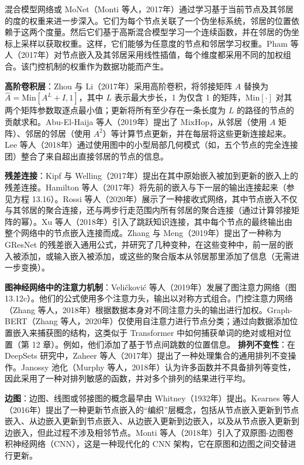 混合模型网络或 MoNet（Monti 等人，2017年）通过学习基于当前节点及其邻居的度的权重来进一步深入。它们为每个节点关联了一个伪坐标系统，邻居的位置依赖于这两个度量。然后它们基于高斯混合模型学习一个连续函数，并在邻居的伪坐标上采样以获取权重。这样，它们能够为任意度的节点和邻居学习权重。Pham 等人（2017年）对节点嵌入及其邻居采用线性插值，每个维度都采用不同的加权组合。该门控机制的权重作为数据功能而产生。

\textbf{高阶卷积层}：Zhou 与 Li（2017年）采用高阶卷积，将邻接矩阵 \(A\) 替换为 \(\hat{A} = \text{Min}[A^L + I, 1]\)，其中 \(L\) 表示最大步长，1 为仅含 1 的矩阵，\(\text{Min}[\cdot]\) 对其两个矩阵参数取逐点最小值；更新将所有至少存在一条长度为 \(L\) 的路径的节点的贡献求和。Abu-El-Haija 等人（2019年）提出了 \(\text{MixHop}\)，从邻居（使用 \(A\) 矩阵）、邻居的邻居（使用 \(A^2\)）等计算节点更新，并在每层将这些更新连接起来。Lee 等人（2018年）通过使用图中的小型局部几何模式（如，五个节点的完全连接团）整合了来自超出直接邻居的节点的信息。

\textbf{残差连接}：Kipf 与 Welling（2017年）提出在其中原始嵌入被加到更新的嵌入上的残差连接。Hamilton 等人（2017年）将先前的嵌入与下一层的输出连接起来（参见方程 13.16）。Rossi 等人（2020年）展示了一种接收式网络，其中节点嵌入不仅与其邻居的聚合连接，还与两步行走范围内所有邻居的聚合连接（通过计算邻接矩阵的幂）。Xu 等人（2018年）引入了跳跃知识连接，其中每个节点的最终输出由整个网络中的节点嵌入连接而成。Zhang 与 Meng（2019年）提出了一种称为 GResNet 的残差嵌入通用公式，并研究了几种变种，在这些变种中，前一层的嵌入被添加，或输入嵌入被添加，或这些的聚合版本从邻居那里添加了信息（无需进一步变换）。

\textbf{图神经网络中的注意力机制}：Veličković 等人（2019年）发展了图注意力网络（图 13.12c）。他们的公式使用多个注意力头，输出以对称方式组合。门控注意力网络（Zhang 等人，2018年）根据数据本身对不同注意力头的输出进行加权。Graph-BERT（Zhang 等人，2020年）仅使用自注意力进行节点分类；通过向数据添加位置嵌入来捕获图的结构，这类似于 Transformer 中如何捕获单词的绝对或相对位置（第 12 章）。例如，他们添加了基于节点间跳数的位置信息。
\textbf{排列不变性}：在 DeepSets 研究中，Zaheer 等人（2017年）提出了一种处理集合的通用排列不变操作。Janossy 池化（Murphy 等人，2018年）认为许多函数并不具备排列等变性，因此采用了一种对排列敏感的函数，并对多个排列的结果进行平均。

\textbf{边图}：边图、线图或邻接图的概念最早由 Whitney（1932年）提出。Kearnes 等人（2016年）提出了一种更新节点嵌入的“编织”层概念，包括从节点嵌入更新到节点嵌入、从边嵌入更新到节点嵌入、从边嵌入更新到边嵌入，以及从节点嵌入更新到边嵌入，但此过程不涉及相邻节点。Monti 等人（2018年）引入了双原图-边图卷积神经网络（CNN），这是一种现代化的 CNN 架构，它在原图和边图之间交替进行更新。


